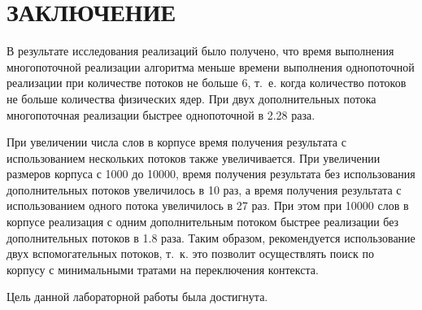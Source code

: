 \chapter*{ЗАКЛЮЧЕНИЕ}

В результате исследования реализаций было получено, что время выполнения многопоточной реализации алгоритма меньше времени выполнения однопоточной реализации при количестве потоков не больше 6, т.~е. когда количество потоков не больше количества физических ядер. При двух дополнительных потока многопоточная реализации быстрее однопоточной в 2.28 раза.

При увеличении числа слов в корпусе время получения результата с использованием нескольких потоков также увеличивается. 
При увеличении размеров корпуса с
1000 до 10000, время получения результата без использования дополнительных потоков
увеличилось в 10 раз, а время получения результата с использованием одного потока увеличилось в 27 раз. 
При этом при 10000 слов в корпусе реализация с одним дополнительным потоком быстрее реализации без дополнительных потоков в 1.8 раза. 
Таким образом, рекомендуется использование
двух вспомогательных потоков, т.~к. это позволит осуществлять поиск по корпусу с минимальными тратами на переключения контекста.

Цель данной лабораторной работы была достигнута.